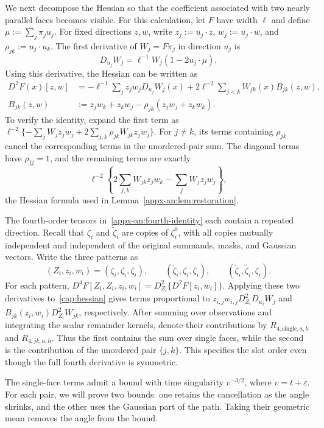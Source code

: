 \documentclass[11pt,letterpaper]{article}
\theoremstyle{remark}
\begin{document}
We next decompose the Hessian so that the coefficient associated
with two nearly parallel faces becomes visible. For this calculation,
let $F$ have width $\ell$ and define $\mu:=\sum_j\pi_j u_j$.
For fixed directions $z,w$, write $z_j:=u_j\cdot z$,
$w_j:=u_j\cdot w$, and $\rho_{jk}:=u_j\cdot u_k$.
The first derivative of $W_j=F\pi_j$ in direction $u_j$ is
\[
 D_{u_j}W_j=\ell^{-1}W_j(1-2u_j\cdot\mu).
\]
Using this derivative, the Hessian can be written as
\begin{align}
 D^2F(x)[z,w]
 &=-\ell^{-1}\sum_jz_jw_j D_{u_j}W_j(x)
     +2\ell^{-2}\sum_{j<k}W_{jk}(x)B_{jk}(z,w),
 \label{cap:hessian}\\
 B_{jk}(z,w)
 &:=z_jw_k+z_kw_j-\rho_{jk}(z_jw_j+z_kw_k).
 \label{cap:pair-coefficient}
\end{align}
To verify the identity, expand the first term as
$\ell^{-2}\{-\sum_jW_jz_jw_j
          +2\sum_{j,k}\rho_{jk}W_{jk}z_jw_j\}$.
For $j\ne k$, its terms containing $\rho_{jk}$ cancel
the corresponding terms in the unordered-pair sum.
The diagonal terms have $\rho_{jj}=1$, and the remaining terms
are exactly
\[
 \ell^{-2}\left\{2\sum_{j,k}W_{jk}z_jw_k
                         -\sum_jW_jz_jw_j\right\},
\]
the Hessian formula used in Lemma~\ref{appx-an:lem:restoration}.

The fourth-order tensors in~\eqref{appx-an:fourth-identity}
each contain a repeated direction. Recall that $\zeta_i$ and
$\widetilde\zeta_i$ are copies of $\zeta_i^0$, with all copies
mutually independent and independent of the original summands,
masks, and Gaussian vectors. Write the three patterns as
\[
 (Z_i,z_i,w_i)
 =(\zeta_i,\zeta_i,\zeta_i),\qquad
   (\widetilde\zeta_i,\zeta_i,\zeta_i),\qquad
   (\widetilde\zeta_i,\widetilde\zeta_i,\zeta_i).
\]
For each pattern,
$D^4F[Z_i,Z_i,z_i,w_i]=D_{Z_i}^2\{D^2F[z_i,w_i]\}$.
Applying these two derivatives to~\eqref{cap:hessian} gives
terms proportional to
$z_{i,j}w_{i,j}D_{Z_i}^2D_{u_j}W_j$ and
$B_{jk}(z_i,w_i)D_{Z_i}^2W_{jk}$, respectively.
After summing over observations and integrating the scalar
remainder kernels, denote their contributions by
$R_{4,\mathrm{single},a,h}$ and $R_{4,jk,a,h}$.
Thus the first contains the sum over single faces, while the
second is the contribution of the unordered pair $\{j,k\}$.
This specifies the slot order even though the full fourth
derivative is symmetric.

The single-face terms admit a bound with time singularity
$v^{-3/2}$, where $v=t+\varepsilon$. For each pair, we will
prove two bounds: one retains the cancellation as the angle
shrinks, and the other uses the Gaussian part of the path.
Taking their geometric mean removes the angle from the bound.
\end{document}
